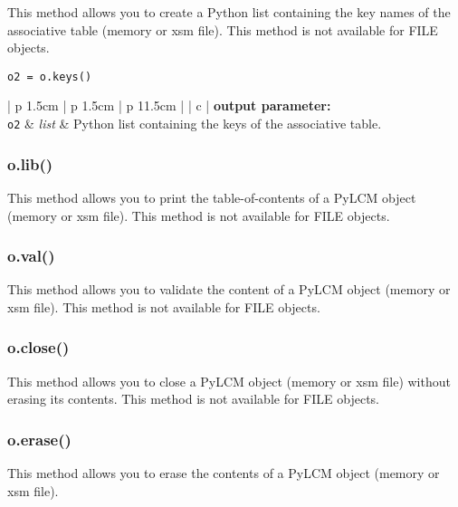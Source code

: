 This method allows you to create a Python list containing the key names of the associative table
(memory or {\sc xsm} file). This method is not available for FILE objects.

\begin{verbatim}
o2 = o.keys()
\end{verbatim}

\noindent
\begin{tabular} {| p {1.5cm} | p {1.5cm} | p {11.5cm} |}
\hline
{} {| c |} {\bf output parameter:} \\
\hline
{\tt o2} & {\it list} & Python list containing the keys of the associative table. \\
\hline
\end{tabular}

\vskip 0.8cm

\subsubsection{o.lib()}

This method allows you to print the table-of-contents of a PyLCM object  (memory or {\sc xsm} file). This method is not available for
FILE objects.

\vskip 0.8cm

\subsubsection{o.val()}

This method allows you to validate the content of a PyLCM object (memory or {\sc xsm} file). This method is not available for
FILE objects.

\vskip 0.8cm

\subsubsection{o.close()}

This method allows you to close a PyLCM object (memory or {\sc xsm} file) without erasing its contents. This method is not available for
FILE objects.

\vskip 0.8cm

\subsubsection{o.erase()}

This method allows you to erase the contents of a PyLCM object (memory or {\sc xsm} file).

